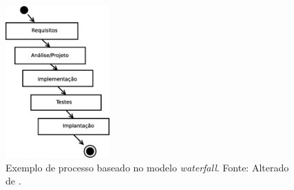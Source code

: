 \begin{figure}[H]
	\centering
	\includegraphics[width=4cm]{figuras/waterfall.eps}
	\caption{Exemplo de processo baseado no modelo \emph{waterfall}. Fonte: Alterado de .}
	\label{waterfall}
\end{figure}


